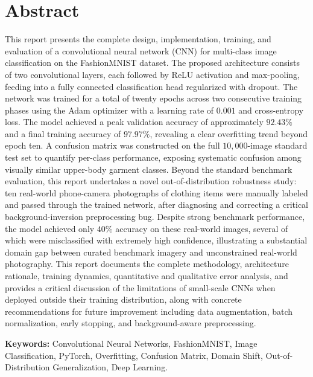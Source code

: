 \documentclass[12pt,a4paper]{report}
\begin{document}
\chapter*{Abstract}
This report presents the complete design, implementation, training, and evaluation of a convolutional neural network (CNN) for multi-class image classification on the FashionMNIST dataset. The proposed architecture consists of two convolutional layers, each followed by ReLU activation and max-pooling, feeding into a fully connected classification head regularized with dropout. The network was trained for a total of twenty epochs across two consecutive training phases using the Adam optimizer with a learning rate of $0.001$ and cross-entropy loss. The model achieved a peak validation accuracy of approximately $92.43\%$ and a final training accuracy of $97.97\%$, revealing a clear overfitting trend beyond epoch ten. A confusion matrix was constructed on the full $10{,}000$-image standard test set to quantify per-class performance, exposing systematic confusion among visually similar upper-body garment classes. Beyond the standard benchmark evaluation, this report undertakes a novel out-of-distribution robustness study: ten real-world phone-camera photographs of clothing items were manually labeled and passed through the trained network, after diagnosing and correcting a critical background-inversion preprocessing bug. Despite strong benchmark performance, the model achieved only $40\%$ accuracy on these real-world images, several of which were misclassified with extremely high confidence, illustrating a substantial domain gap between curated benchmark imagery and unconstrained real-world photography. This report documents the complete methodology, architecture rationale, training dynamics, quantitative and qualitative error analysis, and provides a critical discussion of the limitations of small-scale CNNs when deployed outside their training distribution, along with concrete recommendations for future improvement including data augmentation, batch normalization, early stopping, and background-aware preprocessing.

\vspace{0.5cm}
\noindent\textbf{Keywords:} Convolutional Neural Networks, FashionMNIST, Image Classification, PyTorch, Overfitting, Confusion Matrix, Domain Shift, Out-of-Distribution Generalization, Deep Learning.

\tableofcontents
\listoffigures
\listoftables
\end{document}
